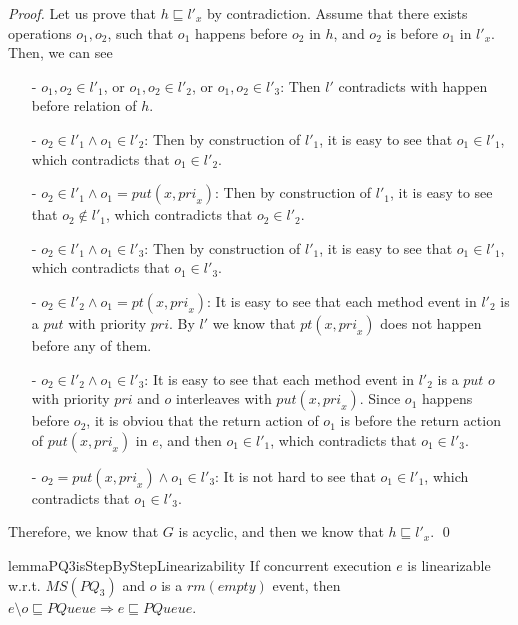 \begin {proof}
Let us prove that $h \sqsubseteq l'_x$ by contradiction. Assume that there exists operations $o_1,o_2$, such that $o_1$ happens before $o_2$ in $h$, and $o_2$ is before $o_1$ in $l'_x$. Then, we can see


\begin{itemize}
\setlength{\itemsep}{0.5pt}
\item[-] $o_1, o_2 \in l'_1$, or $o_1, o_2 \in l'_2$, or $o_1, o_2 \in l'_3$: Then $l'$ contradicts with happen before relation of $h$.

\item[-] $o_2 \in l'_1 \wedge o_1 \in l'_2$: Then by construction of $l'_1$, it is easy to see that $o_1 \in l'_1$, which contradicts that $o_1 \in l'_2$.

\item[-] $o_2 \in l'_1 \wedge o_1 = \textit{put}(x,\textit{pri}_x)$: Then by construction of $l'_1$, it is easy to see that $o_2 \notin l'_1$, which contradicts that $o_2 \in l'_2$.

\item[-] $o_2 \in l'_1 \wedge o_1 \in l'_3$: Then by construction of $l'_1$, it is easy to see that $o_1 \in l'_1$, which contradicts that $o_1 \in l'_3$.

\item[-] $o_2 \in l'_2 \wedge o_1 = \textit{pt}(x,\textit{pri}_x)$: It is easy to see that each method event in $l'_2$ is a $\textit{put}$ with priority $\textit{pri}$. By $l'$ we know that $\textit{pt}(x,\textit{pri}_x)$ does not happen before any of them.

\item[-] $o_2 \in l'_2 \wedge o_1 \in l'_3$: It is easy to see that each method event in $l'_2$ is a $\textit{put}$ $o$ with priority $\textit{pri}$ and $o$ interleaves with $\textit{put}(x,\textit{pri}_x)$. Since $o_1$ happens before $o_2$, it is obviou that the return action of $o_1$ is before the return action of $\textit{put}(x,\textit{pri}_x)$ in $e$, and then $o_1 \in l'_1$, which contradicts that $o_1 \in l'_3$.

\item[-] $o_2 = \textit{put}(x,\textit{pri}_x) \wedge o_1 \in l'_3$: It is not hard to see that $o_1 \in l'_1$, which contradicts that $o_1 \in l'_3$.
\end{itemize}

Therefore, we know that $G$ is acyclic, and then we know that $h \sqsubseteq l'_x$. \qed
\end {proof}


\begin{restatable}{lemma}{PQ3isStepByStepLinearizability}
\label{lemma:PQ3 is step-by-step linearizability}
If concurrent execution $e$ is linearizable w.r.t. $\textit{MS}(\textit{PQ}_3)$ and $o$ is a $\textit{rm}(\textit{empty})$ event, then $e \setminus o \sqsubseteq \textit{PQueue} \Rightarrow e \sqsubseteq \textit{PQueue}$.
\end{restatable}


